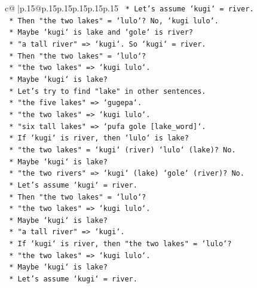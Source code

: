 \documentclass{article}
\begin{document}
{\begin{supertabular}{c@{$\;$}|p{.15\linewidth}@{}p{.15\linewidth}p{.15\linewidth}p{.15\linewidth}p{.15\linewidth}p{.15\linewidth}}
{{{\texttt{                    *   Let's assume `kugi` = river.} \\
\texttt{                    *   Then "the two lakes" = `lulo`? No, `kugi lulo`.} \\
\texttt{                    *   Maybe `kugi` is lake and `gole` is river?} \\
\texttt{                    *   "a tall river" => `kugi`. So `kugi` = river.} \\
\texttt{                    *   Then "the two lakes" = `lulo`?} \\
\texttt{                    *   "the two lakes" => `kugi lulo`.} \\
\texttt{                    *   Maybe `kugi` is lake?} \\
\texttt{                    *   Let's try to find "lake" in other sentences.} \\
\texttt{                    *   "the five lakes" => `gugepa`.} \\
\texttt{                    *   "the two lakes" => `kugi lulo`.} \\
\texttt{                    *   "six tall lakes" => `pufa gole {[}lake\_word{]}`.} \\
\texttt{                    *   If `kugi` is river, then `lulo` is lake?} \\
\texttt{                    *   "the two lakes" = `kugi` (river) `lulo` (lake)? No.} \\
\texttt{                    *   Maybe `kugi` is lake?} \\
\texttt{                    *   "the two rivers" => `kugi` (lake) `gole` (river)? No.} \\
\texttt{                    *   Let's assume `kugi` = river.} \\
\texttt{                    *   Then "the two lakes" = `lulo`?} \\
\texttt{                    *   "the two lakes" => `kugi lulo`.} \\
\texttt{                    *   Maybe `kugi` is lake?} \\
\texttt{                    *   "a tall river" => `kugi`.} \\
\texttt{                    *   If `kugi` is river, then "the two lakes" = `lulo`?} \\
\texttt{                    *   "the two lakes" => `kugi lulo`.} \\
\texttt{                    *   Maybe `kugi` is lake?} \\
\texttt{                    *   Let's assume `kugi` = river.} \\
}}}
\end{supertabular}}
\end{document}
